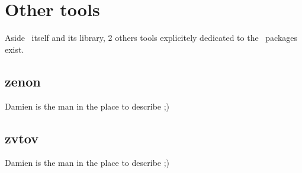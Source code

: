 \section{Other tools}
Aside \focalizec\ itself and its library, 2 others tools explicitely
dedicated to the \focalize\ packages exist.

\subsection{zenon}
Damien is the man in the place to describe ;)

\subsection{zvtov}
Damien is the man in the place to describe ;)
